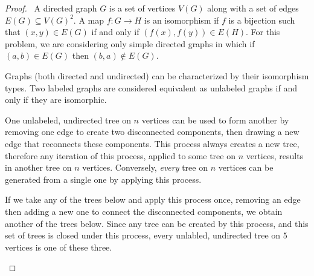 \documentclass[12pt]{article}
\begin{document}
\begin{enumerate}[leftmargin=0cm,itemindent=.5cm,labelwidth=\itemindent,labelsep=0cm,align=left]
\begin{proof}

\ A directed graph $G$ is a set of vertices $V(G)$ along with a set of edges $E(G) \subseteq V(G)^2$.  A map $f: G \rightarrow H$ is an isomorphism if $f$ is a bijection such that $(x,y) \in E(G)$ if and only if $(f(x),f(y)) \in E(H)$.  For this problem, we are considering only simple directed graphs in which if $(a,b) \in E(G)$ then $(b,a) \not \in E(G)$.

Graphs (both directed and undirected) can be characterized by their isomorphism types.  Two labeled graphs are considered equivalent as unlabeled graphs if and only if they are isomorphic.

One unlabeled, undirected tree on $n$ vertices can be used to form another by removing one edge to create two disconnected components, then drawing a new edge that reconnects these components.  This process always creates a new tree, therefore any iteration of this process, applied to some tree on $n$ vertices, results in another tree on $n$ vertices.  Conversely, \emph{every} tree on $n$ vertices can be generated from a single one by applying this process.

If we take any of the trees below and apply this process once, removing an edge then adding a new one to connect the disconnected components, we obtain another of the trees below.  Since any tree can be created by this process, and this set of trees is closed under this process, every unlabled, undirected tree on $5$ vertices is one of these three.

\begin{figure}[h!]
\begin{center}


\end{center}
\end{figure}
\end{proof}
\end{enumerate}
\end{document}
